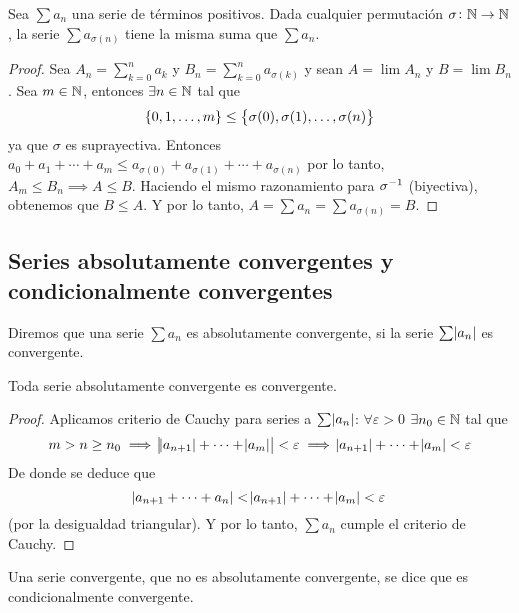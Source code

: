 \begin{prop}
	Sea $\sum a_n$ una serie de términos positivos. Dada cualquier permutación $\sigma
	\colon \mathbb{N} \to \mathbb{N}$, la serie $\sum a_{\sigma(n)}$ tiene la misma suma que $\sum a_n$.
\end{prop}

\begin{proof}
	Sea $A_n = \sum\limits_{k=0}^n a_k$ y $B_n = \sum\limits_{k=0}^n a_{\sigma(k)}$ y sean
	$A = \lim A_n$ y $B = \lim B_n$. Sea
	$m \in \mathbb{N}$, entonces $\exists n \in \mathbb{N}$ tal que
	\[
		\left\{0,1, \dots, m\right\} \leq \left\{\sigma(0), \sigma(1), \dots, \sigma(n)\right\}
	\]
	ya que $\sigma$ es suprayectiva. Entonces $a_0 + a_1 + \cdots + a_m \leq a_{\sigma(0)} +
	a_{\sigma(1)} + \cdots + a_{\sigma(n)}$ por lo tanto, $A_m \leq B_n \implies A \leq B$.
	Haciendo el mismo razonamiento para $\sigma^{-1}$ (biyectiva), obtenemos que $B \leq A$.
	Y por lo tanto, $A = \sum a_n = \sum a_{\sigma(n)} = B$.
\end{proof}

\subsection{Series absolutamente convergentes y condicionalmente convergentes}

\begin{defi}
  Diremos que una serie $\sum a_n$ es absolutamente convergente, si la serie $\sum \abs{a_n}$ es convergente.
\end{defi}

\begin{prop}
  Toda serie absolutamente convergente es convergente.
\end{prop}

\begin{proof}
  Aplicamos criterio de Cauchy para series a $\sum \abs{a_n}$: $\forall \varepsilon > 0$ $\exists n_0 \in \mathbb{N}$
  tal que
  \[
    m > n \geq n_0 \implies \abs{\abs{a_{n+1}} + \cdots + \abs{a_m}} < \varepsilon \implies
    \abs{a_{n+1}} + \cdots + \abs{a_m} < \varepsilon
  \]
  De donde se deduce que
  \[
    \abs{a_{n+1} + \cdots + a_n} < \abs{a_{n+1}} + \cdots + \abs{a_m} < \varepsilon
  \]
  (por la desigualdad triangular). Y por lo tanto, $\sum a_n$ cumple el criterio de Cauchy.

\end{proof}

\begin{defi}
  Una serie convergente, que no es absolutamente convergente, se dice que es condicionalmente convergente.
\end{defi}

